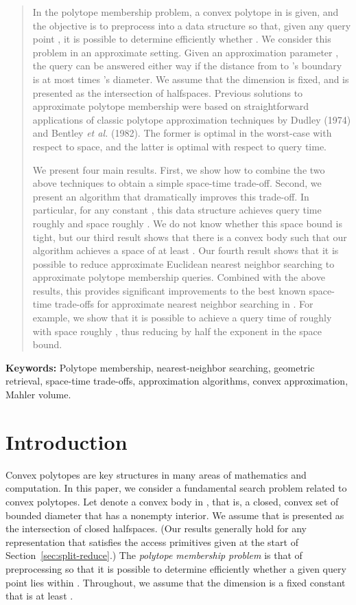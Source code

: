 \documentclass[11pt]{article}   \usepackage[letterpaper,hmargin=2.1cm,vmargin=3cm]{geometry}
\newcommand{\etal}{\textit{et al.}}
\begin{document}
\begin{abstract}
In the polytope membership problem, a convex polytope  in  is given, and the objective is to preprocess  into a data structure so that, given any query point , it is possible to determine efficiently whether . We consider this problem in an approximate setting. Given an approximation parameter , the query can be answered either way if the distance from  to 's boundary is at most  times 's diameter. We assume that the dimension  is fixed, and  is presented as the intersection of  halfspaces. Previous solutions to approximate polytope membership were based on straightforward applications of classic polytope approximation techniques by Dudley (1974) and Bentley {\etal} (1982). The former is optimal in the worst-case with respect to space, and the latter is optimal with respect to query time. 
 
We present four main results. First, we show how to combine the two above techniques to obtain a simple space-time trade-off. Second, we present an algorithm that dramatically improves this trade-off. In particular, for any constant , this data structure achieves query time roughly  and space roughly . We do not know whether this space bound is tight, but our third result shows that there is a convex body such that our algorithm achieves a space of at least . Our fourth result shows that it is possible to reduce approximate Euclidean nearest neighbor searching to approximate polytope membership queries. Combined with the above results, this provides significant improvements to the best known space-time trade-offs for approximate nearest neighbor searching in . For example, we show that it is possible to achieve a query time of roughly  with space roughly , thus reducing by half the exponent in the space bound. 
\end{abstract}


\textbf{Keywords:}
Polytope membership, nearest-neighbor searching, geometric retrieval, space-time trade-offs, approximation algorithms, convex approximation, Mahler volume.

\section{Introduction} \label{sec:intro}


Convex polytopes are key structures in many areas of mathematics and computation. In this paper, we consider a fundamental search problem related to convex polytopes. Let  denote a convex body in , that is, a closed, convex set of bounded diameter that has a nonempty interior. We assume that  is presented as the intersection of  closed halfspaces. (Our results generally hold for any representation that satisfies the access primitives given at the start of Section~\ref{sec:split-reduce}.) The \emph{polytope membership problem} is that of preprocessing  so that it is possible to determine efficiently whether a given query point  lies within . Throughout, we assume that the dimension  is a fixed constant that is at least . 
\end{document}
